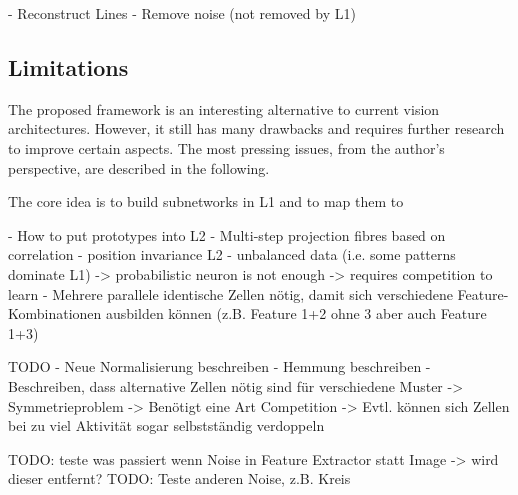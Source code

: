- Reconstruct Lines
- Remove noise (not removed by L1)



\subsection{Limitations}
The proposed framework is an interesting alternative to current vision architectures.
However, it still has many drawbacks and requires further research to improve certain aspects.
The most pressing issues, from the author's perspective, are described in the following.

The core idea is to build subnetworks in L1 and to map them to 


- How to put prototypes into L2
- Multi-step projection fibres based on correlation
- position invariance L2
- unbalanced data (i.e. some patterns dominate L1) -> probabilistic neuron is not enough -> requires competition to learn
- Mehrere parallele identische Zellen nötig, damit sich verschiedene Feature-Kombinationen ausbilden können (z.B. Feature 1+2 ohne 3 aber auch Feature 1+3)


TODO
- Neue Normalisierung beschreiben
- Hemmung beschreiben
- Beschreiben, dass alternative Zellen nötig sind für verschiedene Muster -> Symmetrieproblem -> Benötigt eine Art Competition -> Evtl. können sich Zellen bei zu viel Aktivität sogar selbstständig verdoppeln




TODO: teste was passiert wenn Noise in Feature Extractor statt Image -> wird dieser entfernt?
TODO: Teste anderen Noise, z.B. Kreis


